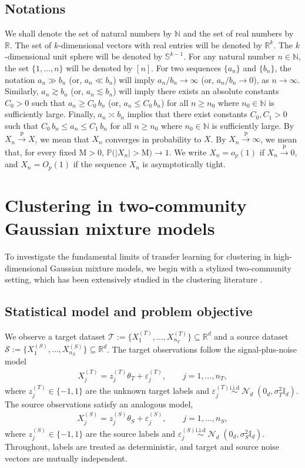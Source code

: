 \documentclass[10pt]{article}
\newcommand{\R}{\mathbb R}
\newcommand{\Pbb}{\mathbb P}
\newcommand{\convp}{\xrightarrow{\mathrm{p}}}
\newcommand{\simiid}{\overset{\mathrm{i.i.d}}{\sim}}
\newcommand{\Id}{\mathbb I}
\DeclareMathOperator{\dnorm}{\mathcal N}
\newcommand{\calT}{\mathcal T}
\newcommand{\trg}{T}
\newcommand{\thetaT}{\theta_{\trg}}
\newcommand{\nT}{n_{\trg}}
\newcommand{\sigmaT}{\sigma_{\trg}}
\newcommand{\Xtar}{X^{(\trg)}}
\newcommand{\ztar}{z^{(\trg)}}
\newcommand{\ept}{\varepsilon^{(\trg)}}
\newcommand{\calS}{\mathcal S}
\newcommand{\src}{S}
\newcommand{\thetaS}{\theta_{\src}}
\newcommand{\nS}{n_{\src}}
\newcommand{\sigmaS}{\sigma_{\src}}
\newcommand{\Xsrc}{X^{(\src)}}
\newcommand{\zsrc}{z^{(\src)}}
\newcommand{\eps}{\varepsilon^{(\src)}}
\begin{document}
\subsection{Notations}
We shall denote the set of natural numbers by $\mathbb N$ and the set of real numbers by $\R$. The set of $k$-dimensional vectors with real entries will be denoted by $\R^k$. The $k$-dimensional unit sphere will be denoted by $\mathbb S^{k-1}$. For any natural number $n \in \mathbb N$, the set $\{1,\ldots,n\}$ will be denoted by $[n]$. For two sequences $\{a_n\}$ and $\{b_n\}$, the notation $a_n \gg b_n$ (or, $a_n \ll b_n$) will imply $a_n/b_n \to \infty$ (or, $a_n/b_n \to 0$), as $n \to \infty$. Similarly, $a_n \gtrsim b_n$ (or, $a_n \lesssim b_n$) will imply there exists an absolute constants $C_0>0$ such that $a_n \ge C_0\,b_n$ (or, $a_n \le C_0\,b_n$) for all $n \ge n_0$ where $n_0 \in \mathbb N$ is sufficiently large. Finally, $a_n \asymp b_n$ implies that there exist constants $C_0,C_1>0$ such that $C_0\,b_n \le a_n \le C_1\,b_n$ for all $n \ge n_0$ where $n_0 \in \mathbb N$ is sufficiently large. By $X_n\convp X$, we mean that $X_n$ converges in probability to $X$. By $X_n\convp\infty$, we mean that, for every fixed $\mathrm M>0$, $\Pbb\bigl(|X_n|>\mathrm M\bigr)\to 1$. We write $X_n=o_p(1)$ if $X_n\convp 0$, and $X_n=O_p(1)$ if the sequence ${X_n}$ is asymptotically tight.

\section{Clustering in two-community Gaussian mixture models}
\label{sec:oracle_two_cluster}
To investigate the fundamental limits of transfer learning for clustering
in high-dimensional Gaussian mixture models, we begin with a stylized
two-community setting, which has been extensively studied in the clustering literature \citep{li2017minimax,Ndaoud2022}.

\subsection{Statistical model and problem objective}
\label{sec:two_comm_model}

We observe a target dataset $\calT := \{\Xtar_1, \ldots, \Xtar_{\nT}\} \subseteq \R^d$ and a source dataset $\calS := \{\Xsrc_1, \ldots, \Xsrc_{\nS}\} \subseteq \R^d$. The target observations follow the signal-plus-noise model
\begin{align}
    \label{eq:target_sample}
    \Xtar_j = \ztar_j \thetaT + \ept_j, \qquad j = 1, \ldots, \nT,
\end{align}
where $\ztar_j \in \{-1, 1\}$ are the unknown target labels and
$\ept_j \simiid \dnorm_d(0_d, \sigmaT^2 \Id_d)$.
The source observations satisfy an analogous model,
\begin{align}
    \label{eq:source_sample}
    \Xsrc_j = \zsrc_j \thetaS + \eps_j, \qquad j = 1, \ldots, \nS,
\end{align}
where $\zsrc_j \in \{-1, 1\}$ are the source labels and
$\eps_j \simiid \dnorm_d(0_d, \sigmaS^2 \Id_d)$.
Throughout, labels are treated as deterministic, and target and source
noise vectors are mutually independent.
\end{document}
